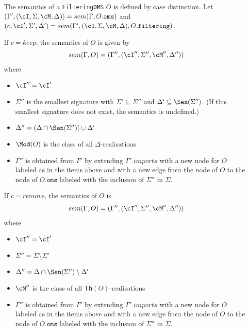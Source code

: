 \documentclass[10pt, a4paper]{isov2}
\newcommand*{\syntax}[1]{\texttt{#1}}
\renewcommand{\Th}{\mathsf{Th}}
\begin{document}
The semantics of a \syntax{FilteringOMS} $O$
is defined by case distinction.
Let
 $(\Gamma',(\cI,\Sigma,\cM, \Delta)) = sem(\Gamma, O.\syntax{oms})$ and
 $(c, \cI',\Sigma',\Delta') = sem(\Gamma', (\cI, \Sigma, \cM, \Delta), O.\syntax{filtering})$.
 
If $c = keep$, 
the semantics of $O$ is given by
$$sem(\Gamma, O) = (\Gamma'',(\cI'',\Sigma'',\cM'',\Delta''))$$
\noindent where
\begin{itemize}
  \item $\cI'' = \cI'$
  \item $\Sigma''$ is the smallest signature
with $\Sigma'\subseteq\Sigma''$ and $\Delta'\subseteq\Sen(\Sigma'')$. ({If this smallest signature does not exist, the semantics is undefined.})
  \item $\Delta'' = (\Delta\cap\Sen(\Sigma''))\cup\Delta'$
  \item $\Mod(O)$ is the class of all $\Delta$-realisations
  \item $\Gamma''$ is obtained from 
       $\Gamma'$
       by extending $\Gamma'.imports$
       with a new node for $O$ labeled as in the items above and
       with a new edge from the node of $O$ to the node of $O.\syntax{oms}$
        labeled with the inclusion of $\Sigma''$ in $\Sigma$.
\end{itemize}

\noindent
If $c = remove$, the semantics of $O$  
is
$$sem(\Gamma, O) = (\Gamma'',(\cI'',\Sigma'',\cM'',\Delta''))$$
\noindent where
\begin{itemize}
  \item $\cI'' = \cI'$
  \item $\Sigma'' = \Sigma\setminus \Sigma'$ 
  \item $\Delta'' = \Delta\cap\Sen(\Sigma'')\setminus\Delta'$
  \item $\cM''$ is the class of all $\Th(O)$-realisations
    \item $\Gamma''$ is obtained from 
       $\Gamma'$
       by extending $\Gamma'.imports$
       with a new node for $O$ labeled as in the items above and
       with a new edge from the node of $O$ to the node of $O.\syntax{oms}$
        labeled with the inclusion of $\Sigma''$ in $\Sigma$.
\end{itemize}

\end{document}

